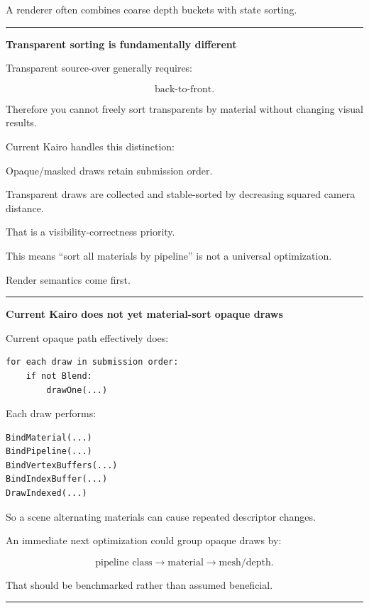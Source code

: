 A renderer often combines coarse depth buckets with state sorting.

\begin{center}\rule{0.5\linewidth}{0.5pt}\end{center}

\textbf{Transparent sorting is fundamentally different}

Transparent source-over generally requires:

\[
\text{back-to-front}.
\]

Therefore you cannot freely sort transparents by material without changing visual results.

Current Kairo handles this distinction:

Opaque/masked draws retain submission order.

Transparent draws are collected and stable-sorted by decreasing squared camera distance.

That is a visibility-correctness priority.

This means ``sort all materials by pipeline'' is not a universal optimization.

Render semantics come first.

\begin{center}\rule{0.5\linewidth}{0.5pt}\end{center}

\textbf{Current Kairo does not yet material-sort opaque draws}

Current opaque path effectively does:

\begin{verbatim}
for each draw in submission order:
    if not Blend:
        drawOne(...)
\end{verbatim}

Each draw performs:

\begin{verbatim}
BindMaterial(...)
BindPipeline(...)
BindVertexBuffers(...)
BindIndexBuffer(...)
DrawIndexed(...)
\end{verbatim}

So a scene alternating materials can cause repeated descriptor changes.

An immediate next optimization could group opaque draws by:

\[
\text{pipeline class}
\rightarrow
\text{material}
\rightarrow
\text{mesh/depth}.
\]

That should be benchmarked rather than assumed beneficial.

\begin{center}\rule{0.5\linewidth}{0.5pt}\end{center}


